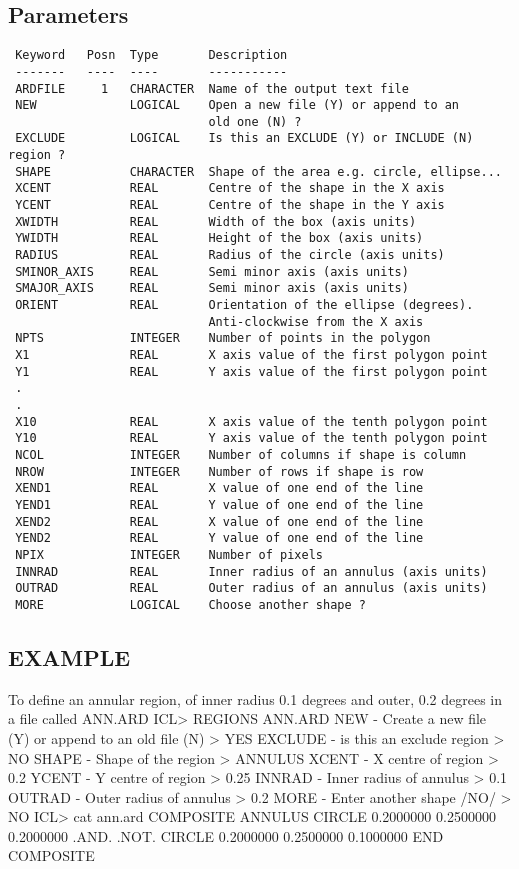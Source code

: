 \documentclass{book}
\renewcommand{\_}{{\tt\char'137}}     %
\begin{document}
\subsection{Parameters}
\begin{verbatim}
 Keyword   Posn  Type       Description
 -------   ----  ----       -----------
 ARDFILE     1   CHARACTER  Name of the output text file
 NEW             LOGICAL    Open a new file (Y) or append to an
                            old one (N) ?
 EXCLUDE         LOGICAL    Is this an EXCLUDE (Y) or INCLUDE (N) region ?
 SHAPE           CHARACTER  Shape of the area e.g. circle, ellipse...
 XCENT           REAL       Centre of the shape in the X axis
 YCENT           REAL       Centre of the shape in the Y axis
 XWIDTH          REAL       Width of the box (axis units)
 YWIDTH          REAL       Height of the box (axis units)
 RADIUS          REAL       Radius of the circle (axis units)
 SMINOR_AXIS     REAL       Semi minor axis (axis units)
 SMAJOR_AXIS     REAL       Semi minor axis (axis units)
 ORIENT          REAL       Orientation of the ellipse (degrees).
                            Anti-clockwise from the X axis
 NPTS            INTEGER    Number of points in the polygon
 X1              REAL       X axis value of the first polygon point
 Y1              REAL       Y axis value of the first polygon point
 .
 .
 X10             REAL       X axis value of the tenth polygon point
 Y10             REAL       Y axis value of the tenth polygon point
 NCOL            INTEGER    Number of columns if shape is column
 NROW            INTEGER    Number of rows if shape is row
 XEND1           REAL       X value of one end of the line
 YEND1           REAL       Y value of one end of the line
 XEND2           REAL       X value of one end of the line
 YEND2           REAL       Y value of one end of the line
 NPIX            INTEGER    Number of pixels
 INNRAD          REAL       Inner radius of an annulus (axis units)
 OUTRAD          REAL       Outer radius of an annulus (axis units)
 MORE            LOGICAL    Choose another shape ?

\end{verbatim}\subsection{EXAMPLE}
To define an annular region, of inner radius 0.1 degrees and outer,
0.2 degrees in a file called ANN.ARD
ICL> REGIONS ANN.ARD
NEW - Create a new file (Y) or append to an old file (N) > YES
EXCLUDE - is this an exclude region > NO
SHAPE - Shape of the region > ANNULUS
XCENT - X centre of region > 0.2
YCENT - Y centre of region > 0.25
INNRAD - Inner radius of annulus > 0.1
OUTRAD - Outer radius of annulus > 0.2
MORE - Enter another shape /NO/ > NO
ICL> cat ann.ard
COMPOSITE ANNULUS
CIRCLE 0.2000000 0.2500000 0.2000000
.AND. .NOT. CIRCLE 0.2000000 0.2500000 0.1000000
END COMPOSITE
\end{document}
